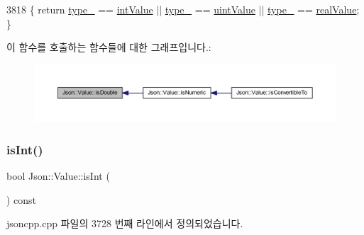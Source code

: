 \begin{DoxyCode}
3818 \{ \textcolor{keywordflow}{return} \hyperlink{class_json_1_1_value_abd222c2536dc88bf330dedcd076d2356}{type\_} == \hyperlink{namespace_json_a7d654b75c16a57007925868e38212b4eae5a9d708d5c9e23ae9bf98898522512d}{intValue} || \hyperlink{class_json_1_1_value_abd222c2536dc88bf330dedcd076d2356}{type\_} == \hyperlink{namespace_json_a7d654b75c16a57007925868e38212b4eaea788d9a3bb00adc6d68d97d43e1ccd3}{uintValue} || 
      \hyperlink{class_json_1_1_value_abd222c2536dc88bf330dedcd076d2356}{type\_} == \hyperlink{namespace_json_a7d654b75c16a57007925868e38212b4eab837c7b869c14d8be712deb45c9e490e}{realValue}; \}
\end{DoxyCode}
이 함수를 호출하는 함수들에 대한 그래프입니다.\+:\nopagebreak
\begin{figure}[H]
\begin{center}
\leavevmode
\includegraphics[width=350pt]{class_json_1_1_value_a4a2e2a790e19a1c09fc5dd12d7ad47b5_icgraph}
\end{center}
\end{figure}
\mbox{\label{class_json_1_1_value_aff51d8b52979ca06cf9d909accd5f695}} 
\subsubsection{\texorpdfstring{is\+Int()}{isInt()}}
{\footnotesize\ttfamily bool Json\+::\+Value\+::is\+Int (\begin{DoxyParamCaption}{ }\end{DoxyParamCaption}) const}



jsoncpp.\+cpp 파일의 3728 번째 라인에서 정의되었습니다.


